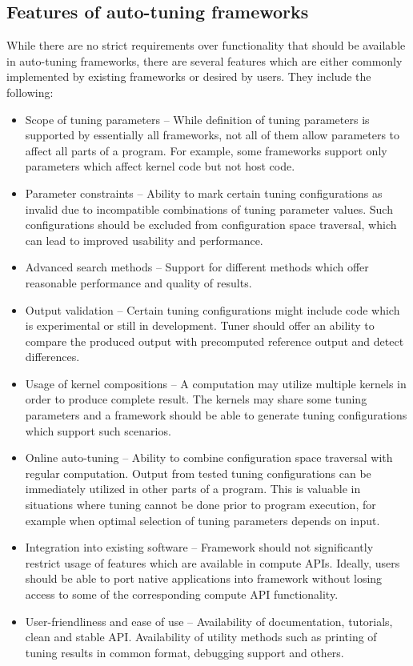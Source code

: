 \documentclass[
  digital,     %
  oneside,     %
  nosansbold,  %
  nocolorbold, %
  lof,         %
  lot,         %
  nocover
]{fithesis4}
\begin{document}
\subsection{Features of auto-tuning frameworks}
While there are no strict requirements over functionality that should be available in auto-tuning frameworks, there are several features which are either commonly implemented by existing frameworks or desired by users. They include the following: 
\begin{itemize}
	\item Scope of tuning parameters -- While definition of tuning parameters is supported by essentially all frameworks, not all of them allow parameters to affect all parts of a program. For example, some frameworks support only parameters which affect kernel code but not host code.
	\item Parameter constraints -- Ability to mark certain tuning configurations as invalid due to incompatible combinations of tuning parameter values. Such configurations should be excluded from configuration space traversal, which can lead to improved usability and performance.
	\item Advanced search methods -- Support for different methods which offer reasonable performance and quality of results.
	\item Output validation -- Certain tuning configurations might include code which is experimental or still in development. Tuner should offer an ability to compare the produced output with precomputed reference output and detect differences.
	\item Usage of kernel compositions -- A computation may utilize multiple kernels in order to produce complete result. The kernels may share some tuning parameters and a framework should be able to generate tuning configurations which support such scenarios.
	\item Online auto-tuning -- Ability to combine configuration space traversal with regular computation. Output from tested tuning configurations can be immediately utilized in other parts of a program. This is valuable in situations where tuning cannot be done prior to program execution, for example when optimal selection of tuning parameters depends on input.
	\item Integration into existing software -- Framework should not significantly restrict usage of features which are available in compute APIs. Ideally, users should be able to port native applications into framework without losing access to some of the corresponding compute API functionality.
	\item User-friendliness and ease of use -- Availability of documentation, tutorials, clean and stable API. Availability of utility methods such as printing of tuning results in common format, debugging support and others.
\end{itemize}
\end{document}
